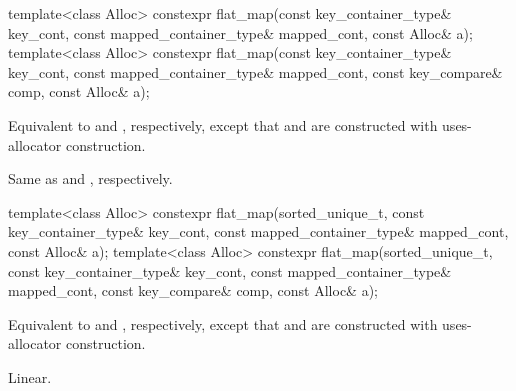 %
\begin{itemdecl}
template<class Alloc>
  constexpr flat_map(const key_container_type& key_cont, const mapped_container_type& mapped_cont,
                     const Alloc& a);
template<class Alloc>
  constexpr flat_map(const key_container_type& key_cont, const mapped_container_type& mapped_cont,
                     const key_compare& comp, const Alloc& a);
\end{itemdecl}

\begin{itemdescr}
\pnum
\effects
Equivalent to  and
, respectively,
except that  and  are constructed with
uses-allocator construction.

\pnum
\complexity
Same as  and
, respectively.
\end{itemdescr}

%
\begin{itemdecl}
template<class Alloc>
  constexpr flat_map(sorted_unique_t, const key_container_type& key_cont,
                     const mapped_container_type& mapped_cont, const Alloc& a);
template<class Alloc>
  constexpr flat_map(sorted_unique_t, const key_container_type& key_cont,
                     const mapped_container_type& mapped_cont, const key_compare& comp,
                     const Alloc& a);
\end{itemdecl}

\begin{itemdescr}
\pnum
\effects
Equivalent to  and
, respectively,
except that  and  are constructed
with uses-allocator construction.

\pnum
\complexity
Linear.
\end{itemdescr}

